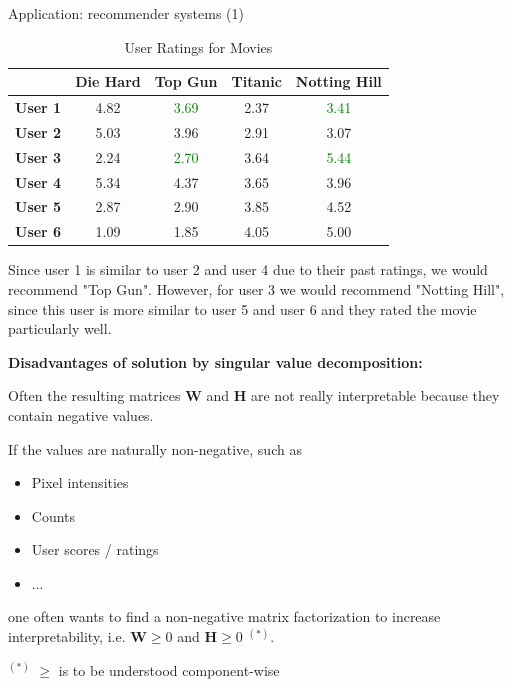 \documentclass[11pt,compress,t,notes=noshow, xcolor=table]{beamer}
\begin{document}
\begin{vbframe}{Application: recommender systems (1)}
\begin{enumerate}
\begin{footnotesize}
\begin{center}
\begin{table}[h!]
    \centering
    \begin{tabular}{|l|c|c|c|c|}
    \hline
           & \textbf{Die Hard} & \textbf{Top Gun} & \textbf{Titanic} & \textbf{Notting Hill} \\ \hline
    \textbf{User 1} & 4.82 & \textcolor{green}{3.69} & 2.37 & \textcolor{green}{3.41} \\ \hline
    \textbf{User 2} & 5.03 & 3.96 & 2.91 & 3.07 \\ \hline
    \textbf{User 3} & 2.24 & \textcolor{green}{2.70} & 3.64 & \textcolor{green}{5.44} \\ \hline
    \textbf{User 4} & 5.34 & 4.37 & 3.65 & 3.96 \\ \hline
    \textbf{User 5} & 2.87 & 2.90 & 3.85 & 4.52 \\ \hline
    \textbf{User 6} & 1.09 & 1.85 & 4.05 & 5.00 \\ \hline
    \end{tabular}
    \caption{User Ratings for Movies}
  \end{table}    
\end{center}
\end{footnotesize}
\normalsize
Since user 1 is similar to user 2 and user 4 due to their past ratings, we would recommend "Top Gun". However, for user 3 we would recommend "Notting Hill", since this user is more similar to user 5 and user 6 and they rated the movie particularly well.

\end{enumerate}

\framebreak

\textbf{Disadvantages of solution by singular value decomposition:}

\lz

Often the resulting matrices $\mathbf{W}$ and $\mathbf{H}$ are not really interpretable because they contain negative values.

\vspace*{0.2cm}

If the values are naturally non-negative, such as

\begin{itemize}
\item Pixel intensities
\item Counts
\item User scores / ratings
\item ...
\end{itemize}

one often wants to find a non-negative matrix factorization to increase interpretability, i.e. $\mathbf{W}\ge 0$ and $\mathbf{H}\ge 0$ $^{(*)}$.

\vfill

\begin{footnotesize}
 $^{(*)}$ $\ge$ is to be understood component-wise
\end{footnotesize}
\end{vbframe}



\endlecture
\end{document}

